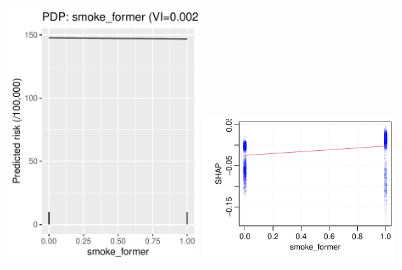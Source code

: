 \documentclass[12pt]{article}
\begin{document}
\begin{figure}[h]
\centering
\includegraphics[width=0.45\textwidth]{figures/pdp/smoke_former.pdf}
\includegraphics[width=0.45\textwidth]{figures/shap/smoke_former.pdf}
\end{figure}
\end{document}
